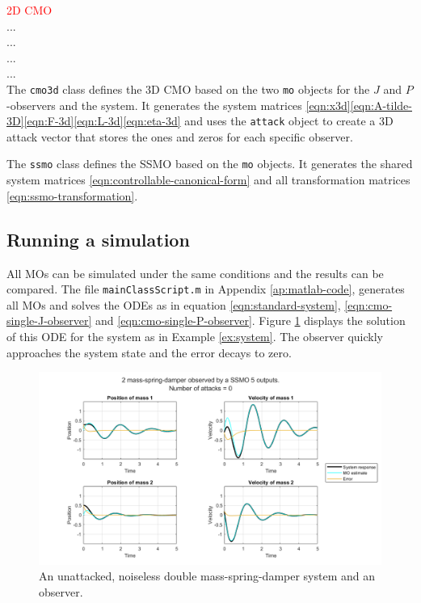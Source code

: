 \textcolor{red}{2D CMO}\\
...\\
...\\
...\\
...\\

The \texttt{cmo3d} class defines the 3D CMO based on the two \texttt{mo} objects for the $J$ and $P$-observers and the system. It generates the system matrices \eqref{eqn:x3d}\eqref{eqn:A-tilde-3D}\eqref{eqn:F-3d}\eqref{eqn:L-3d}\eqref{eqn:eta-3d} and uses the \texttt{attack} object to create a 3D attack vector that stores the ones and zeros for each specific observer.

The \texttt{ssmo} class defines the SSMO based on the \texttt{mo} objects. It generates the shared system matrices \eqref{eqn:controllable-canonical-form} and all transformation matrices \eqref{eqn:ssmo-transformation}. 

\subsection{Running a simulation}
All MOs can be simulated under the same conditions and the results can be compared. The file \texttt{mainClassScript.m} in Appendix \ref{ap:matlab-code}, generates all MOs and solves the ODEs as in equation \eqref{eqn:standard-system}, \eqref{eqn:cmo-single-J-observer} and \eqref{eqn:cmo-single-P-observer}. Figure \ref{fig:unattacked-system-plot} displays the solution of this ODE for the system as in Example \ref{ex:system}. The observer quickly approaches the system state and the error decays to zero.

\begin{figure}[ht]
    \centering
    \includegraphics[width=\linewidth]{report/Figures/symplot_5o0a.png}
    \caption{An unattacked, noiseless double mass-spring-damper system and an observer.}
    \label{fig:unattacked-system-plot}
\end{figure}

